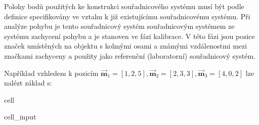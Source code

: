 \documentclass[letterpaper,10pt,english]{jupyterBook}
\begin{document}
\sphinxAtStartPar
Polohy bodů použitých ke konstrukci souřadnicového systému musí být podle definice specifikovány ve vztahu k již existujícímu souřadnicovému systému. Při analýze pohybu je tento souřadnicový systém souřadnicovým systémem ze systému zachycení pohybu a je stanoven ve fázi kalibrace. V této fázi jsou pozice značek umístěných na objektu s kolmými osami a známými vzdálenostmi mezi značkami zachyceny a použity jako referenční (laboratorní) souřadnicový systém.

\sphinxAtStartPar
Například vzhledem k pozicím \(\overrightarrow{\mathbf{m}}_1 = [1,2,5], \overrightarrow{\mathbf{m}}_2 = [2,3,3], \overrightarrow{\mathbf{m}}_3 = [4,0,2]\) lze nalézt základ s:

\begin{sphinxuseclass}{cell}\begin{sphinxVerbatimInput}

\begin{sphinxuseclass}{cell_input}
\begin{sphinxVerbatim}[commandchars=\\\{\}]
   

  \PYG{p}{[}  \PYG{p}{]}
  \PYG{p}{[}  \PYG{p}{]}
  \PYG{p}{[}  \PYG{p}{]}

                    
       
          

  
  
  


\end{sphinxVerbatim}
\end{sphinxuseclass}
\end{sphinxVerbatimInput}
\end{sphinxuseclass}
\end{document}
